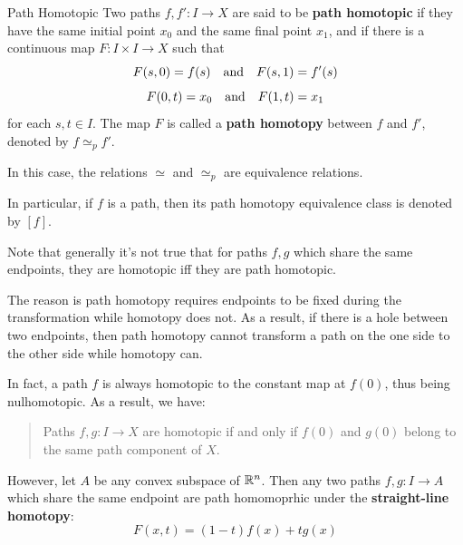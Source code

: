 \documentclass[12pt,a4paper]{article}
\begin{document}
    \begin{defi}{Path Homotopic}
        Two paths $f,f':I\to X$ are said to be \textbf{path homotopic} if they have the same initial point $x_0$ and the same final point $x_1$, and if there is a continuous map $F:I\times I\to X$ such that
        \[
            F(s,0)=f(s)\quad\text{and}\quad F(s,1)=f'(s)
        \]
        \[
            F(0,t)=x_0\quad\text{and}\quad F(1,t)=x_1
        \]
        for each $s,t\in I$. The map $F$ is called a \textbf{path homotopy} between $f$ and $f'$, denoted by $f\simeq_p f'$.
    \end{defi}
    \begin{remark}
        In this case, the relations $\simeq$ and $\simeq_p$ are equivalence relations.

        In particular, if $f$ is a path, then its path homotopy equivalence class is denoted by $[f]$.
    \end{remark}
    \begin{remark}
        Note that generally it's not true that for paths $f,g$ which share the same endpoints, they are homotopic iff they are path homotopic.
        
        The reason is path homotopy requires endpoints to be fixed during the transformation while homotopy does not. As a result, if there is a hole between two endpoints, then path homotopy cannot transform a path on the one side to the other side while homotopy can.

        In fact, a path $f$ is always homotopic to the constant map at $f(0)$, thus being nulhomotopic. As a result, we have:
        \begin{quote}
            Paths $f,g:I\to X$ are homotopic if and only if $f(0)$ and $g(0)$ belong to the same path component of $X$.
        \end{quote}
    \end{remark}
    \begin{remark}
        However, let $A$ be any convex subspace of $\mathbb{R}^n$. Then any two paths $f,g:I\to A$ which share the same endpoint are path homomoprhic under the \textbf{straight-line homotopy}:
        \[
            F(x,t)=(1-t)f(x)+tg(x)
        \]
    \end{remark}
    \bigskip
\end{document}
